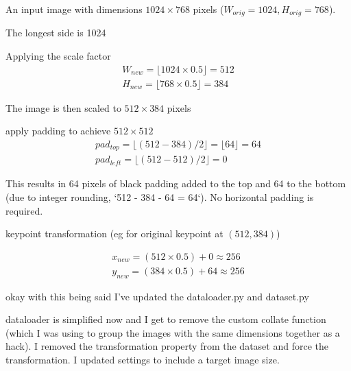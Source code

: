 An input image with dimensions $1024 \times 768$ pixels ($W_{orig}=1024, H_{orig}=768$).

\begin{compactitem}
	\item The longest side is 1024
	\item Applying the scale factor
	\begin{equation}
		\label{eq:case_3_scale}
		\begin{aligned}
			W_{new} = \lfloor 1024 \times 0.5 \rfloor = 512 \\
			H_{new} = \lfloor 768 \times 0.5 \rfloor = 384
		\end{aligned}
	\end{equation}
	\item The image is then scaled to $512 \times 384$ pixels
	\item apply padding to achieve $512 \times 512$
	\begin{equation}
		\label{eq:case_3_padding}
		\begin{aligned}
			pad_{top} = \lfloor (512 - 384) / 2 \rfloor = \lfloor 64 \rfloor = 64 \\
			pad_{left} = \lfloor (512 - 512) / 2 \rfloor = 0
		\end{aligned}
	\end{equation}

	\item This results in 64 pixels of black padding added to the top and 64 to the
	bottom (due to integer rounding, `512 - 384 - 64 = 64`). No horizontal padding
	is required.
	\item keypoint transformation (eg for original keypoint at $(512,384)$)

	\begin{equation}
		\label{eq:case_3_keypoint_transformation}
		\begin{aligned}
			x_{new} = (512 \times 0.5) + 0 \approx 256 \\
			y_{new} = (384 \times 0.5) + 64 \approx 256
		\end{aligned}
	\end{equation}
\end{compactitem}

okay with this being said I've updated the dataloader.py and dataset.py

dataloader is simplified now and I get to remove the custom collate function (which I was using
to group the images with the same dimensions together as a hack). I removed the transformation
property from the dataset and force the transformation. I updated settings to include a target image size.

